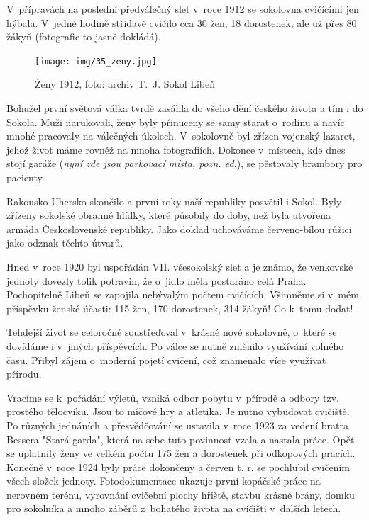 \documentclass[a5paper, 11pt, twoside]{article}
\begin{document}
V~přípravách na poslední předválečný slet v~roce 1912 se sokolovna
cvičícími jen hýbala. V~jedné hodině střídavě cvičilo cca 30 žen, 18
dorostenek, ale už přes 80 žákyň (fotografie to jasně dokládá).

\begin{figure}[h!]
  \centering 
  \texttt{[image: img/35\_zeny.jpg]}
  \caption*{Ženy 1912, foto: archiv T.~J. Sokol Libeň}
\end{figure}

Bohužel první světová válka tvrdě zasáhla do všeho dění českého života a
tím i do Sokola. Muži narukovali, ženy byly přinuceny se samy starat
o~rodinu a navíc mnohé pracovaly na válečných úkolech. V~sokolovně byl
zřízen vojenský lazaret, jehož život máme rovněž na mnoha fotografiích.
Dokonce v~místech, kde dnes stojí garáže (\textit{nyní zde jsou parkovací
místa, pozn. ed.}), se pěstovaly brambory pro pacienty.

Rakousko-Uhersko skončilo a první roky naší republiky posvětil i Sokol.
Byly zřízeny sokolské obranné hlídky, které působily do doby, než byla
utvořena armáda Československé republiky. Jako doklad uchováváme
červeno-bílou růžici jako odznak těchto útvarů.

Hned v~roce 1920 byl uspořádán VII. všesokolský slet a je známo, že
venkovské jednoty dovezly tolik potravin, že o~jídlo měla postaráno celá
Praha. Pochopitelně Libeň se zapojila nebývalým počtem cvičících.
Všimněme si v~mém příspěvku ženské účasti: 115 žen, 170 dorostenek, 314
žákyň! Co k~tomu dodat!

Tehdejší život se celoročně soustřeďoval v~krásné nové sokolovně,
o~které se dovídáme i v~jiných příspěvcích. Po válce se nutně změnilo
využívání volného času. Přibyl zájem o~moderní pojetí cvičení, což
znamenalo více využívat přírodu.

Vracíme se k~pořádání výletů, vzniká odbor pobytu v~přírodě a odbory
tzv. prostého tělocviku. Jsou to míčové hry a atletika. Je nutno
vybudovat cvičiště. Po různých jednáních a přesvědčování se ustavila
v~roce 1923 za vedení bratra Bessera "Stará garda", která na sebe tuto
povinnost vzala a nastala práce. Opět se uplatnily ženy ve velkém počtu
175 žen a dorostenek při odkopových pracích. Konečně v~roce 1924 byly
práce dokončeny a červen t. r. se pochlubil cvičením všech složek
jednoty. Fotodokumentace ukazuje první kopáčské práce na nerovném
terénu, vyrovnání cvičební plochy hřiště, stavbu krásné brány, domku pro
sokolníka a mnoho záběrů z~bohatého života na cvičišti v~dalších letech.
\end{document}

